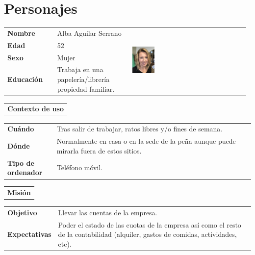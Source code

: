 \documentclass[11pt]{article}
\begin{document}
\section{Personajes}
\begin{table}[H]
	\centering
	\begin{tabular}{p{0.2\linewidth}|p{0.3\linewidth}p{0.475\linewidth}}
		\toprule
		\textbf{Nombre} & Alba Aguilar Serrano &\multirow{4}{*}{\begin{minipage}{1.\textwidth}\includegraphics[width=0.2\textwidth, height=30mm]{Alba}\end{minipage}}\\
		\textbf{Edad} & 52 & \\
		\textbf{Sexo} & Mujer & \\
		\textbf{Educación} & Trabaja en una papelería/librería propiedad familiar.  & \\
		\bottomrule
	\end{tabular}
	
	\begin{tabular}{l}
		\textbf{Contexto de uso} 
	\end{tabular}
	
	\begin{tabular}{p{0.2\linewidth}|p{0.8\linewidth}}
		\toprule
		\textbf{Cuándo} & Tras salir de trabajar, ratos libres y/o fines de semana.\\
		\textbf{Dónde}  & Normalmente en casa o en la sede de la peña aunque puede mirarla fuera de estos sitios.\\
		\textbf{Tipo de ordenador} & Teléfono móvil.\\
		\bottomrule
	\end{tabular}
	
	\begin{tabular}{l}
		\textbf{Misión} 
	\end{tabular}
	
	\begin{tabular}{p{0.2\linewidth}|p{0.8\linewidth}}
		\toprule
		\textbf{Objetivo} & Llevar las cuentas de la empresa.
		\\
		\textbf{Expectativas}  & Poder el estado de las cuotas de la empresa así como el resto de la contabilidad (alquiler, gastos de comidas, actividades, etc). \\
		\bottomrule
	\end{tabular}
	

\end{table}
\end{document}
